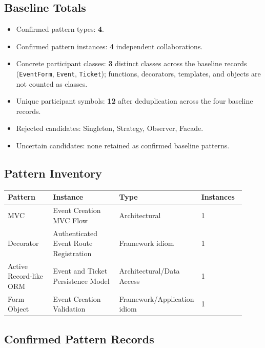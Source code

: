 \documentclass[11pt,a4paper]{article}
\begin{document}
\subsection{Baseline Totals}
\begin{itemize}
\item Confirmed pattern types: \textbf{4}.
\item Confirmed pattern instances: \textbf{4} independent collaborations.
\item Concrete participant classes: \textbf{3} distinct classes across the baseline records (\texttt{EventForm}, \texttt{Event}, \texttt{Ticket}); functions, decorators, templates, and objects are not counted as classes.
\item Unique participant symbols: \textbf{12} after deduplication across the four baseline records.
\item Rejected candidates: Singleton, Strategy, Observer, Facade.
\item Uncertain candidates: none retained as confirmed baseline patterns.
\end{itemize}

\subsection{Pattern Inventory}
\begin{longtable}{p{0.22\linewidth}p{0.34\linewidth}p{0.16\linewidth}p{0.20\linewidth}}
\toprule
Pattern & Instance & Type & Instances\\
\midrule
MVC & Event Creation MVC Flow & Architectural & 1\\
Decorator & Authenticated Event Route Registration & Framework idiom & 1\\
Active Record-like ORM & Event and Ticket Persistence Model & Architectural/Data Access & 1\\
Form Object & Event Creation Validation & Framework/Application idiom & 1\\
\bottomrule
\end{longtable}

\subsection{Confirmed Pattern Records}
\end{document}
